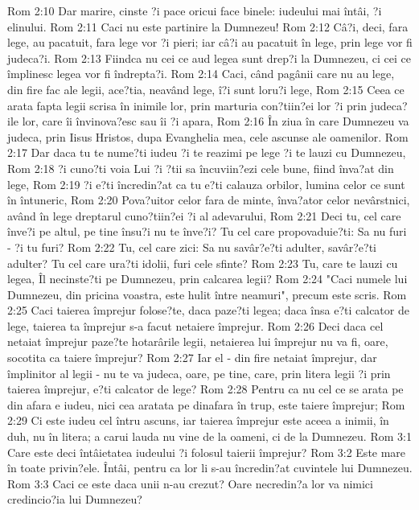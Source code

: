 Rom 2:10  Dar marire, cinste ?i pace oricui face binele: iudeului mai întâi, ?i elinului.
Rom 2:11  Caci nu este partinire la Dumnezeu!
Rom 2:12  Câ?i, deci, fara lege, au pacatuit, fara lege vor ?i pieri; iar câ?i au pacatuit în lege, prin lege vor fi judeca?i.
Rom 2:13  Fiindca nu cei ce aud legea sunt drep?i la Dumnezeu, ci cei ce împlinesc legea vor fi îndrepta?i.
Rom 2:14  Caci, când pagânii care nu au lege, din fire fac ale legii, ace?tia, neavând lege, î?i sunt loru?i lege,
Rom 2:15  Ceea ce arata fapta legii scrisa în inimile lor, prin marturia con?tiin?ei lor ?i prin judeca?ile lor, care îi învinova?esc sau îi ?i apara,
Rom 2:16  În ziua în care Dumnezeu va judeca, prin Iisus Hristos, dupa Evanghelia mea, cele ascunse ale oamenilor.
Rom 2:17  Dar daca tu te nume?ti iudeu ?i te reazimi pe lege ?i te lauzi cu Dumnezeu,
Rom 2:18  ?i cuno?ti voia Lui ?i ?tii sa încuviin?ezi cele bune, fiind înva?at din lege,
Rom 2:19  ?i e?ti încredin?at ca tu e?ti calauza orbilor, lumina celor ce sunt în întuneric,
Rom 2:20  Pova?uitor celor fara de minte, înva?ator celor nevârstnici, având în lege dreptarul cuno?tiin?ei ?i al adevarului,
Rom 2:21  Deci tu, cel care înve?i pe altul, pe tine însu?i nu te înve?i? Tu cel care propovaduie?ti: Sa nu furi - ?i tu furi?
Rom 2:22  Tu, cel care zici: Sa nu savâr?e?ti adulter, savâr?e?ti adulter? Tu cel care ura?ti idolii, furi cele sfinte?
Rom 2:23  Tu, care te lauzi cu legea, Îl necinste?ti pe Dumnezeu, prin calcarea legii?
Rom 2:24  "Caci numele lui Dumnezeu, din pricina voastra, este hulit între neamuri", precum este scris.
Rom 2:25  Caci taierea împrejur folose?te, daca paze?ti legea; daca însa e?ti calcator de lege, taierea ta împrejur s-a facut netaiere împrejur.
Rom 2:26  Deci daca cel netaiat împrejur paze?te hotarârile legii, netaierea lui împrejur nu va fi, oare, socotita ca taiere împrejur?
Rom 2:27  Iar el - din fire netaiat împrejur, dar împlinitor al legii - nu te va judeca, oare, pe tine, care, prin litera legii ?i prin taierea împrejur, e?ti calcator de lege?
Rom 2:28  Pentru ca nu cel ce se arata pe din afara e iudeu, nici cea aratata pe dinafara în trup, este taiere împrejur;
Rom 2:29  Ci este iudeu cel întru ascuns, iar taierea împrejur este aceea a inimii, în duh, nu în litera; a carui lauda nu vine de la oameni, ci de la Dumnezeu.
Rom 3:1  Care este deci întâietatea iudeului ?i folosul taierii împrejur?
Rom 3:2  Este mare în toate privin?ele. Întâi, pentru ca lor li s-au încredin?at cuvintele lui Dumnezeu.
Rom 3:3  Caci ce este daca unii n-au crezut? Oare necredin?a lor va nimici credincio?ia lui Dumnezeu?
